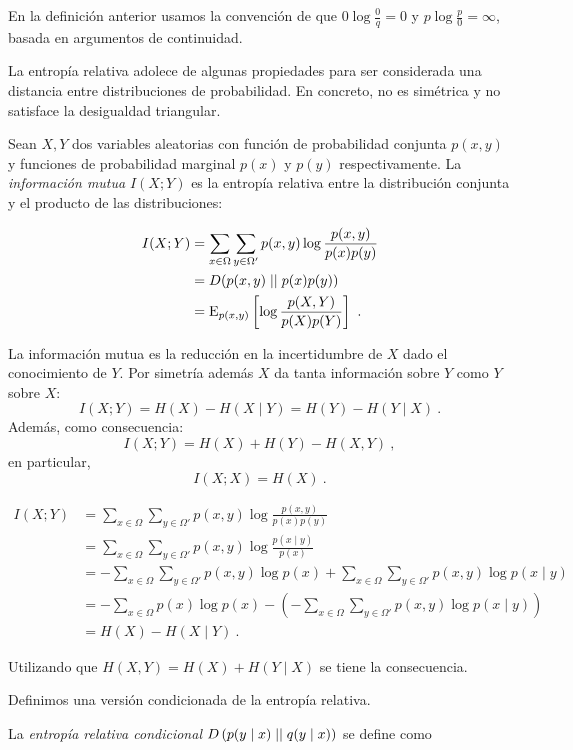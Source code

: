 En la definición anterior usamos la convención de que
\(0\log\frac 0 q=0\) y \(p\log\frac p 0=\infty\), basada en argumentos
de continuidad.

La entropía relativa adolece de algunas propiedades para ser considerada
una distancia entre distribuciones de probabilidad. En concreto, no es
simétrica y no satisface la desigualdad triangular.

Sean \(X, Y\) dos variables aleatorias con función de probabilidad
conjunta \(p(x,y)\) y funciones de probabilidad marginal \(p(x)\) y
\(p(y)\) respectivamente. La \emph{información mutua} \(I(X;Y)\) es la
entropía relativa entre la distribución conjunta y el producto de las
distribuciones:

\begin{align*}
  I(X;Y)&=\sum_{x\in\Omega}\sum_{y\in\Omega'}p(x,y)\log\frac{p(x,y)}{p(x)p(y)}\\
        &=D(p(x,y)\mid\mid p(x)p(y))\\
        &=\mathrm{E}_{p(x,y)}\left[\log\frac{p(X,Y)}{p(X)p(Y)}\right]~.
\end{align*}


\theob
La información mutua es la reducción en la incertidumbre de \(X\) dado
el conocimiento de \(Y\). Por simetría además \(X\) da tanta información
sobre \(Y\) como \(Y\) sobre \(X\):
\[I(X;Y)=H(X)-H(X\mid Y)=H(Y)-H(Y\mid X)~.\] Además, como consecuencia:
\[I(X;Y)=H(X)+H(Y)-H(X,Y)~,\] en particular, \[I(X;X)=H(X)~.\] \proofb

\begin{align*}
  I(X;Y)&=\sum_{x\in\Omega}\sum_{y\in\Omega'}p(x,y)\log\frac{p(x,y)}{p(x)p(y)}\\
        &=\sum_{x\in\Omega}\sum_{y\in\Omega'}p(x,y)\log\frac{p(x\mid y)}{p(x)}\\
        &=-\sum_{x\in\Omega}\sum_{y\in\Omega'}p(x,y)\log p(x) + \sum_{x\in\Omega}\sum_{y\in\Omega'}p(x,y)\log p(x\mid y)\\
        &=-\sum_{x\in\Omega}p(x)\log p(x) -\left(- \sum_{x\in\Omega}\sum_{y\in\Omega'}p(x,y)\log p(x\mid y)\right)\\
        &=H(X)-H(X\mid Y)~.
\end{align*}

Utilizando que \(H(X,Y)=H(X)+H(Y\mid X)\) se tiene la consecuencia.
\proofe

\theoe

Definimos una versión condicionada de la entropía relativa.

La \emph{entropía relativa condicional}
\(D\left(p(y\mid x)\mid\mid q(y\mid x)\right)\) se define como

